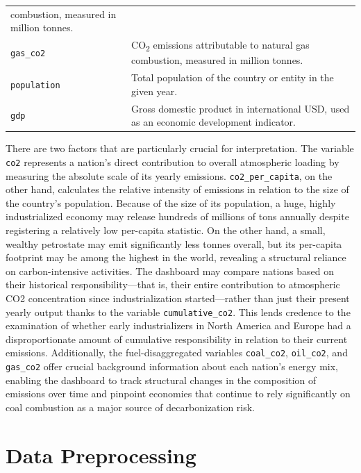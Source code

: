 \documentclass[a4paper,12pt]{article}
\begin{document}
\begin{table}[H]
\begin{tabular}{L{0.32\textwidth} L{0.57\textwidth}}
                              combustion, measured in million tonnes. \\
\texttt{gas\_co2}           & CO\textsubscript{2} emissions attributable to natural gas
                              combustion, measured in million tonnes. \\
\texttt{population}         & Total population of the country or entity in the
                              given year. \\
\texttt{gdp}                & Gross domestic product in international USD, used as
                              an economic development indicator. \\
\bottomrule
\end{tabular}
\normalsize
\setlength{\tabcolsep}{6pt}
\end{table}

There are two factors that are particularly crucial for interpretation. The variable \texttt{co2} represents a nation's direct contribution to overall atmospheric loading by measuring the absolute scale of its yearly emissions. \texttt{co2\_per\_capita}, on the other hand, calculates the relative intensity of emissions in relation to the size of the country's population.
Because of the size of its population, a huge, highly industrialized economy may release hundreds of millions of tons annually despite registering a relatively low per-capita statistic.
On the other hand, a small, wealthy petrostate may emit significantly less tonnes overall, but its per-capita footprint may be among the highest in the world, revealing a structural reliance on carbon-intensive activities.
The dashboard may compare nations based on their historical responsibility—that is, their entire contribution to atmospheric CO2 concentration since industrialization started—rather than just their present yearly output thanks to the variable \texttt{cumulative\_co2}. This lends credence to the examination of whether early industrializers in North America and Europe had a disproportionate amount of cumulative responsibility in relation to their current emissions. Additionally, the fuel-disaggregated variables \texttt{coal\_co2}, \texttt{oil\_co2}, and \texttt{gas\_co2} offer crucial background information about each nation's energy mix, enabling the dashboard to track structural changes in the composition of emissions over time and pinpoint economies that continue to rely significantly on coal combustion as a major source of decarbonization risk.

\section{Data Preprocessing}
\end{document}
